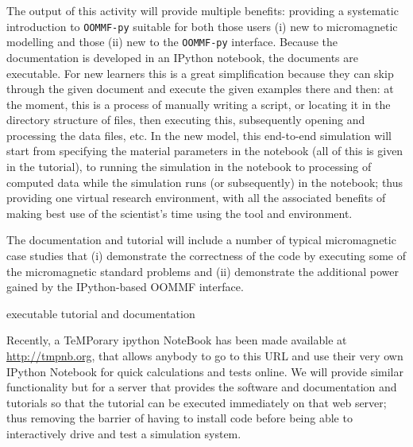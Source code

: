\begin{workpackage}[id=UI,wphases=24-48,
  title=User Interfaces,
  PSRM=1,
  JURM=12, %
  LLRM=1, %
  SARM=1, %
  UKRM=1, %
  UBRM=1, %
  USORM=25]
\begin{tasklist}
\begin{task}[title=OOMMF case study: \OOMMFNB{} tutorial and documentation]
  The output of this activity will provide multiple benefits:
  providing a systematic introduction to \texttt{OOMMF-py} suitable for both
  those users (i) new to micromagnetic modelling and those (ii) new to
  the \texttt{OOMMF-py} interface. Because the documentation is developed in an
  IPython notebook, the documents are executable. For new learners
  this is a great simplification because they can skip through the
  given document and execute the given examples there and then: at the
  moment, this is a process of manually writing a script, or locating
  it in the directory structure of files, then executing this,
  subsequently opening and processing the data files, etc. In the new
  model, this end-to-end simulation will start from specifying the
  material parameters in the notebook (all of this is given in the
  tutorial), to running the simulation in the notebook to processing
  of computed data while the simulation runs (or subsequently) in the
  notebook; thus providing one virtual research environment, with all
  the associated benefits of making best use of the scientist's time
  using the tool and environment.

  The documentation and tutorial will include a number of typical
  micromagnetic case studies that (i) demonstrate the correctness of
  the code by executing some of the micromagnetic standard problems
  and (ii) demonstrate the additional power gained by the
  IPython-based OOMMF interface.
\end{task}
\end{tasklist}

\begin{wpdelivs}
  \begin{wpdeliv}[due=21,id=del:oommf-nb-documentation,dissem=??,nature=??]
      {\OOMMFNB{}    executable tutorial and documentation}
\end{wpdeliv}
\end{wpdelivs}


\begin{tasklist}
\begin{task}[id=oommf-nb-ve,title=OOMMF case study: \OOMMFNB{} virtual environments]
  Recently, a TeMPorary ipython NoteBook has been made available at
  \href{http://tmpnb.org}{http://tmpnb.org}, that allows anybody to go
  to this URL and use their very own IPython Notebook for quick
  calculations and tests online. We will provide similar functionality
  but for a server that provides the \OOMMFNB{} software and \OOMMFNB{}
  documentation and tutorials so that the tutorial can be executed
  immediately on that web server; thus removing the barrier of having
  to install code before being able to interactively drive and test a
  simulation system.


\end{task}
\end{tasklist}
\end{workpackage}
